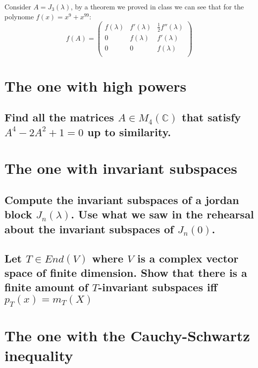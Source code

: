 \documentclass[11pt,a4paper]{article}
\theoremstyle{plain}
\newcommand{\C}{\mathbb{C}}
\begin{document}
	Consider $A = J_3(\lambda)$, by a theorem we proved
	in class we can see that for the polynome $f(x) = x^9 + x^{99}$:
	\[
		f(A) = 
		\begin{pmatrix}
		f(\lambda) & f'(\lambda) & \frac{1}{2}f''(\lambda)\\
		0 & f(\lambda) & f'(\lambda)\\
		0 & 0 & f(\lambda)\\
		\end{pmatrix}
	\]

	\newpage

	\section{The one with high powers}
	\subsection{Find all the matrices $A\in M_4(\C)$ that satisfy $A^4-2A^2+1=0$
	up to similarity.}

	\newpage

	\section{The one with invariant subspaces}
	\subsection{Compute the invariant subspaces of a jordan block $J_n(\lambda)$.
	Use what we saw in the rehearsal about the invariant subspaces of $J_n(0)$.}

	\newpage

	\subsection{Let $T\in End(V)$ where $V$ is a complex vector space of finite
	dimension. Show that there is a finite amount of $T$-invariant subspaces iff
	$p_T(x) = m_T(X)$}

\newpage
	\section{The one with the Cauchy-Schwartz inequality}
	
\end{document}
